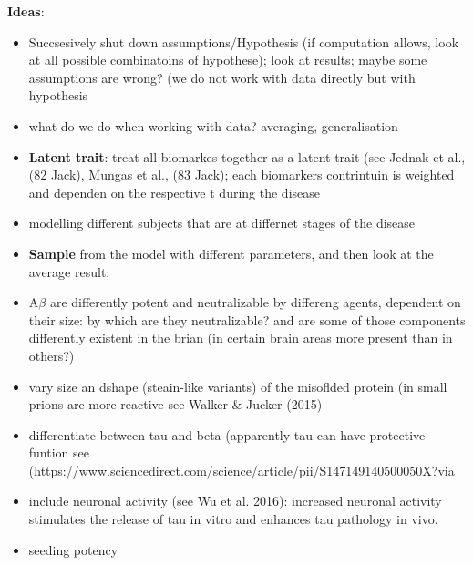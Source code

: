 \documentclass[fleqn]{article}\usepackage{caption}
\begin{document}
%
%
\textbf{Ideas}: 
\begin{itemize}
\item Succsesively shut down assumptions/Hypothesis (if computation allows, look at all possible combinatoins of hypothese); look at results; maybe some assumptions are wrong? (we do not work with data directly but with hypothesis
\item what do we do when working with data? averaging, generalisation

\item \textbf{Latent trait}: treat all biomarkes together as a latent trait (see Jednak et al., (82 Jack), Mungas et al., (83 Jack); each biomarkers contrintuin is weighted and dependen on the respective  t during the disease 
\item modelling different subjects that are at differnet stages of the disease
\item \textbf{Sample} from the model with different parameters, and then look at the average result;
\item A$\beta$ are differently potent and neutralizable by differeng agents, dependent on their size: by which are they neutralizable? and are some of those components differently existent in the brian (in certain brain areas more present than in others?)
\item vary size an dshape (steain-like variants) of the misoflded protein (in small prions are more reactive see Walker \& Jucker (2015) %
\item differentiate between tau and beta (apparently tau can have protective funtion see (https://www.sciencedirect.com/science/article/pii/S147149140500050X?via%
\item include neuronal activity (see Wu et al. 2016): increased neuronal activity stimulates the release of tau in vitro and enhances tau pathology in vivo. 
\item seeding potency
\end{itemize}
\end{document}
